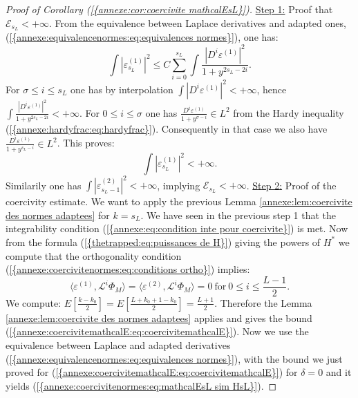 \documentclass[11pt,a4paper,reqno]{amsart}
\theoremstyle{remark}
\numberwithin{equation}{section}
\begin{document}
\begin{appendix}
\begin{proof}[Proof of Corollary {{\rm (\ref{{annexe:cor:coercivite mathcalEsL}})}}]
\underline{Step 1:} Proof that $\mathcal{E}_{s_L}<+\infty$. From the equivalence between Laplace derivatives and adapted ones, {{\rm (\ref{{annexe:equivalencenormes:eq:equivalences normes}})}}, one has:
$$
\int |\varepsilon^{(1)}_{s_L}|^2 \leq C\sum_{i=0}^{s_L} \int \frac{|D^i\varepsilon^{(1)}|^2}{1+y^{2s_L-2i}}.
$$
For $\sigma \leq i \leq s_L$ one has by interpolation $\int |D^i\varepsilon^{(1)}|^2<+\infty$, hence $\int \frac{|D^i\varepsilon^{(1)}|^2}{1+y^{2s_L-2i}}<+\infty$. For $0\leq i \leq \sigma$ one has $ \frac{D^i\varepsilon^{(1)}}{1+y^{\sigma-i}}\in L^2$ from the Hardy inequality {{\rm (\ref{{annexe:hardyfrac:eq:hardyfrac}})}}. Consequently in that case we also have $\frac{D^i\varepsilon^{(1)}}{1+y^{s_L-i}} \in L^2$. This proves:
$$
\int |\varepsilon^{(1)}_{s_L}|^2<+\infty.
$$
Similarily one has $\int |\varepsilon^{(2)}_{s_L-1}|^2<+\infty$, implying $\mathcal{E}_{s_L}<+\infty$. \underline{Step 2:} Proof of the coercivity estimate. We want to apply the previous Lemma \ref{annexe:lem:coercivite des normes adaptees} for $k=s_L$. We have seen in the previous step 1 that the integrability condition {{\rm (\ref{{annexe:eq:condition inte pour coercivite}})}} is met. Now from the formula {{\rm (\ref{{thetrapped:eq:puissances de H}})}} giving the powers of $H^{*}$ we compute that the orthogonality condition {{\rm (\ref{{annexe:coercivitenormes:eq:conditions ortho}})}} implies:
$$
\langle \varepsilon^{(1)},\mathcal{L}^i \Phi_M \rangle=\langle \varepsilon^{(2)}, \mathcal{L}^i \Phi_M \rangle=0 \  \text{for} \ 0\leq i \leq \frac{L-1}{2}.
$$
We compute: $E\left[\frac{k-k_0}{2}\right]=E\left[\frac{L+k_0+1-k_0}{2}\right]=\frac{L+1}{2}$. Therefore the Lemma \ref{annexe:lem:coercivite des normes adaptees} applies and gives the bound {{\rm (\ref{{annexe:coercivitemathcalE:eq:coercivitemathcalE}})}}. Now we use the equivalence between Laplace and adapted derivatives {{\rm (\ref{{annexe:equivalencenormes:eq:equivalences normes}})}}, with the bound we just proved for {{\rm (\ref{{annexe:coercivitemathcalE:eq:coercivitemathcalE}})}} for $\delta=0$ and it yields {{\rm (\ref{{annexe:coercivitenormes:eq:mathcalEsL sim HsL}})}}.
\end{proof}


\end{appendix}
\end{document}
